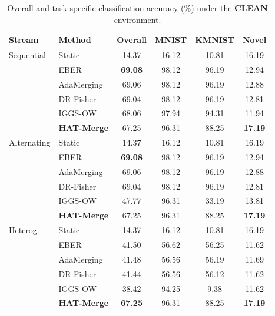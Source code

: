 \documentclass{article}
\theoremstyle{plain}
\theoremstyle{definition}
\theoremstyle{remark}
\begin{document}
\begin{table}[t]
\caption{Overall and task-specific classification accuracy (\%) under the \textbf{CLEAN} environment.}
\label{tab:clean_results}
\vskip 0.15in
\begin{center}
\begin{footnotesize}
\begin{sc}
\setlength{\tabcolsep}{1.5pt}\begin{tabular}{@{}llcccc@{}}
\toprule
Stream & Method & Overall & MNIST & KMNIST & Novel \\
\midrule
Sequential & Static & 14.37 & 16.12 & 10.81 & 16.19 \\
& EBER & \textbf{69.08} & 98.12 & 96.19 & 12.94 \\
& AdaMerging & 69.06 & 98.12 & 96.19 & 12.88 \\
& DR-Fisher & 69.04 & 98.12 & 96.19 & 12.81 \\
& IGGS-OW & 68.06 & 97.94 & 94.31 & 11.94 \\
& \textbf{HAT-Merge} & 67.25 & 96.31 & 88.25 & \textbf{17.19} \\
\midrule
Alternating & Static & 14.37 & 16.12 & 10.81 & 16.19 \\
& EBER & \textbf{69.08} & 98.12 & 96.19 & 12.94 \\
& AdaMerging & 69.06 & 98.12 & 96.19 & 12.88 \\
& DR-Fisher & 69.04 & 98.12 & 96.19 & 12.81 \\
& IGGS-OW & 47.77 & 96.31 & 33.19 & 13.81 \\
& \textbf{HAT-Merge} & 67.25 & 96.31 & 88.25 & \textbf{17.19} \\
\midrule
Heterog. & Static & 14.37 & 16.12 & 10.81 & 16.19 \\
& EBER & 41.50 & 56.62 & 56.25 & 11.62 \\
& AdaMerging & 41.48 & 56.56 & 56.19 & 11.69 \\
& DR-Fisher & 41.44 & 56.56 & 56.12 & 11.62 \\
& IGGS-OW & 38.42 & 94.25 & 9.38 & 11.62 \\
& \textbf{HAT-Merge} & \textbf{67.25} & 96.31 & 88.25 & \textbf{17.19} \\
\bottomrule
\end{tabular}
\end{sc}
\end{footnotesize}
\end{center}
\vskip -0.1in
\end{table}
\end{document}
